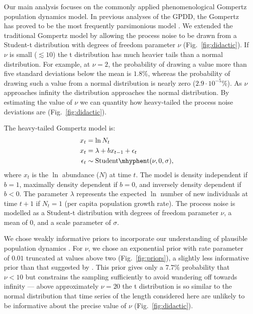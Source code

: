 Our main analysis focuses on the commonly applied phenomenological Gompertz
population dynamics model. In previous analyses of the GPDD, the Gompertz has
proved to be the most frequently parsimonious model \citep{brook2006}. We
extended the traditional Gompertz model by allowing the process noise to be
drawn from a Student-t distribution with degrees of freedom parameter $\nu$
(Fig.~\ref{fig:didactic}). If $\nu$ is small ($\lesssim 10$) the t distribution
has much heavier tails than a normal distribution. For example, at $\nu = 2$,
the probability of drawing a value more than five standard deviations below the
mean is $1.8$\%, whereas the probability of drawing such a value from a normal
distribution is nearly zero ($2.9\cdot10^{-5}$\%). As $\nu$ approaches infinity
the distribution approaches the normal distribution. By estimating the value of
$\nu$ we can quantity how heavy-tailed the process noise deviations are
(Fig.~\ref{fig:didactic}).

The heavy-tailed Gompertz model is:
\begin{align*}
x_t &= \ln N_t\\
x_t &= \lambda + b x_{t-1} + \epsilon_t\\
\epsilon_t &\sim \mathrm{Student\mhyphen t}(\nu, 0, \sigma),
\end{align*}
where $x_t$ is the $\ln$ abundance ($N$) at time $t$. The model is density
independent if $b = 1$, maximally density dependent if $b = 0$, and inversely
density dependent if $b < 0$. The parameter $\lambda$ represents the expected
$\ln$ number of new individuals at time $t + 1$ if $N_t = 1$ (per capita
population growth rate). The process noise is modelled as a Student-t
distribution with degrees of freedom parameter $\nu$, a mean of $0$, and
a scale parameter of $\sigma$.

We chose weakly informative priors to incorporate our understanding of
plausible population dynamics \citep[Supporting Material]{gelman2014}. For
$\nu$, we chose an exponential prior with rate parameter of $0.01$ truncated at
values above two (Fig.~\ref{fig:priors}), a slightly less informative prior
than that suggested by \citet{fernandez1998}. This prior gives only a 7.7\%
probability that $\nu < 10$ but constrains the sampling sufficiently to avoid
wandering off towards infinity --- above approximately $\nu = 20$ the
t distribution is so similar to the normal distribution that time series of the
length considered here are unlikely to be informative about the precise value
of $\nu$ (Fig.~\ref{fig:didactic}).

